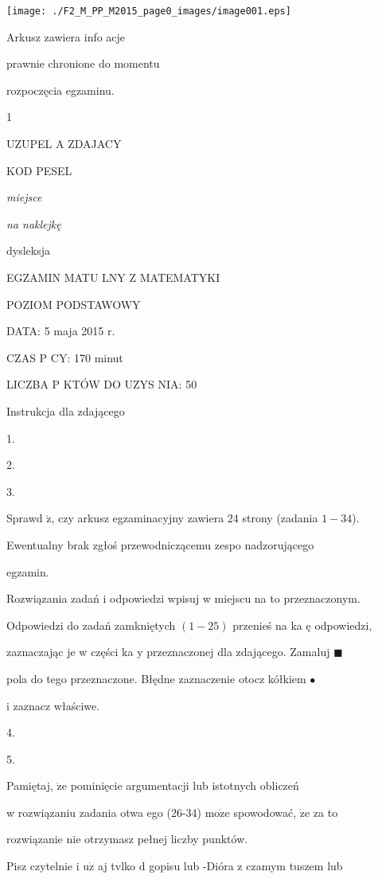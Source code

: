 \documentclass[a4paper,12pt]{article}
\begin{document}
\begin{center}
\texttt{[image: ./F2\_M\_PP\_M2015\_page0\_images/image001.eps]}
\end{center}
Arkusz zawiera info acje

prawnie chronione do momentu

rozpoczęcia egzaminu.

1

UZUPEL  A ZDAJACY

KOD  PESEL

{\it miejsce}

{\it na naklejkę}

dysleksja

EGZAMIN MATU  LNY Z MATEMATYKI

POZIOM PODSTAWOWY

DATA: 5 maja 2015 r.

CZAS P CY: 170 minut

LICZBA P  KTÓW DO UZYS NIA: 50

Instrukcja dla zdającego

1.

2.

3.

Sprawd $\acute{\mathrm{z}}$, czy arkusz egzaminacyjny zawiera 24 strony (zadania $1-34$).

Ewentualny brak zgłoś przewodniczącemu zespo nadzorującego

egzamin.

Rozwiązania zadań i odpowiedzi wpisuj w miejscu na to przeznaczonym.

Odpowiedzi do zadań zamkniętych $(1-25)$ przenieś na ka ę odpowiedzi,

zaznaczając je w części ka $\mathrm{y}$ przeznaczonej dla zdającego. Zamaluj $\blacksquare$

pola do tego przeznaczone. Błędne zaznaczenie otocz kółkiem \fcircle$\bullet$

i zaznacz właściwe.

4.

5.

Pamiętaj, $\dot{\mathrm{z}}\mathrm{e}$ pominięcie argumentacji lub istotnych obliczeń

w rozwiązaniu zadania otwa ego (26-34) $\mathrm{m}\mathrm{o}\dot{\mathrm{z}}\mathrm{e}$ spowodować, $\dot{\mathrm{z}}\mathrm{e}$ za to

rozwiązanie nie otrzymasz pełnej liczby punktów.

Pisz czytelnie i $\mathrm{u}\dot{\mathrm{z}}$ aj tvlko $\mathrm{d}$ gopisu lub -Dióra z czamym tuszem lub
\end{document}
